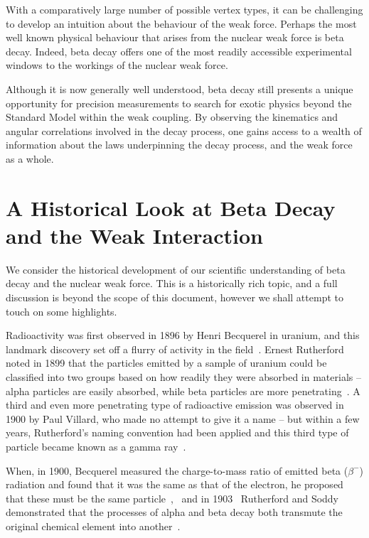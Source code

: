 With a comparatively large number of possible vertex types, it can be challenging to develop an intuition about the behaviour of the weak force. 
Perhaps the most well known physical behaviour that arises from the nuclear weak force is beta decay. 
Indeed, beta decay
offers one of the most readily accessible experimental windows to the workings of the nuclear weak force.

Although it is now generally well understood, beta decay still presents a unique opportunity for precision measurements to search for exotic physics beyond the Standard Model within the weak coupling.
By observing the kinematics and angular correlations involved in the decay process, one gains access to a wealth of information about the 
laws underpinning the decay process, and the weak force as a whole.  



\section{A Historical Look at Beta Decay and the Weak Interaction}

We consider the historical development of our scientific understanding of beta decay and the nuclear weak force.  This is a historically rich topic, and a full discussion is beyond the scope of this document, however we shall attempt to touch on some highlights.

Radioactivity was first observed in 1896 by Henri Becquerel in uranium, and this landmark discovery set off a flurry of activity in the field~\cite{becquerel1896}.
Ernest Rutherford noted in 1899 that the particles emitted by a sample of uranium could be classified into two groups based on how readily they were absorbed in materials -- alpha particles are easily absorbed, while beta particles are more penetrating~\cite{rutherford1899}.  A third and even more penetrating type of radioactive emission was observed in 1900 by Paul Villard, who made no attempt to give it a name -- but within a few years, Rutherford's naming convention had been applied and this third type of particle became known as a gamma ray~\cite{villard1900,rutherford1903}.  


When, in 1900, Becquerel measured the charge-to-mass ratio of emitted beta ($\beta^-$) radiation and found that it was the same as that of the electron, he proposed that these must be the same particle~\cite{becquerel1900},~ and in 1903~ Rutherford and Soddy demonstrated that the processes of alpha and beta decay both transmute the original chemical element into another~\cite{rutherfordsoddy1903}.


